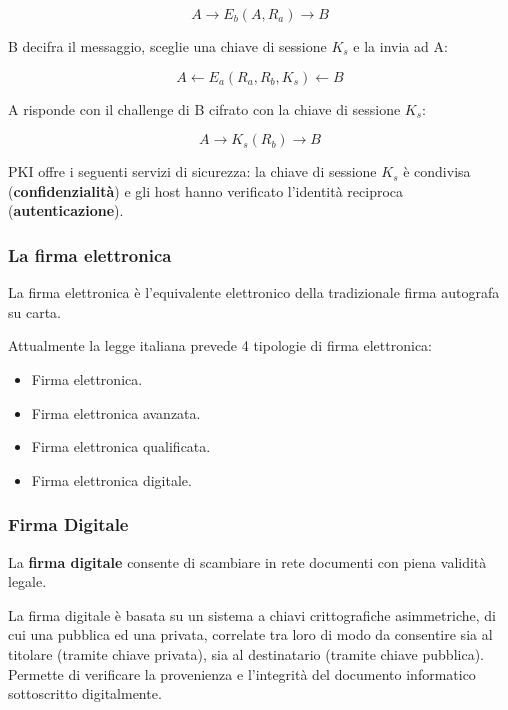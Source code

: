             \begin{equation*}
                A \rightarrow E_b(A,R_a) \rightarrow B
            \end{equation*}

            B decifra il messaggio, sceglie una chiave di sessione $K_s$ e la invia ad A: 
            
            \begin{equation*}
                A \leftarrow E_a(R_a,R_b,K_s) \leftarrow B
            \end{equation*}

            A risponde con il challenge di B cifrato con la chiave di sessione $K_s$:
            
            \begin{equation*}
                A \rightarrow K_s(R_b) \rightarrow B
            \end{equation*}

            PKI offre i seguenti servizi di sicurezza: la chiave di sessione $K_s$ è condivisa (\textbf{confidenzialità}) e gli host hanno verificato l'identità reciproca (\textbf{autentica\-zione}).

        \subsubsection{La firma elettronica}
            La firma elettronica è l'equivalente elettronico della tradizionale firma autografa su carta.
        
            Attualmente la legge italiana prevede 4 tipologie di firma elettronica:
            \begin{itemize}
                \item Firma elettronica.
                \item Firma elettronica avanzata.
                \item Firma elettronica qualificata.
                \item Firma elettronica digitale.
            \end{itemize}

        \subsubsection{Firma Digitale}
            La \textbf{firma digitale} consente di scambiare in rete documenti con piena validità legale.
        
            La firma digitale è basata su un sistema a chiavi crittografiche asimmetriche, di cui una pubblica ed una privata, correlate tra loro di modo da consentire sia al titolare (tramite chiave privata), sia al destinatario (tramite chiave pubblica). Permette di verificare la provenienza e l'integrità del documento informatico sottoscritto digitalmente.
        
